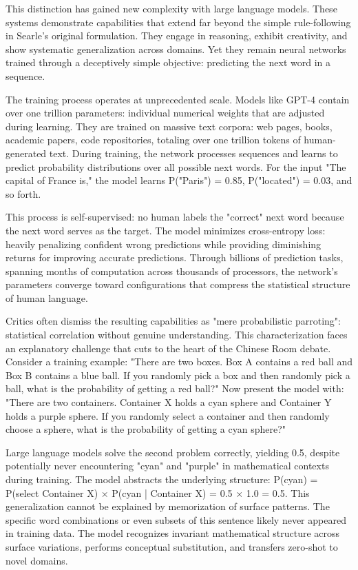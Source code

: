 This distinction has gained new complexity with large language models. These systems demonstrate capabilities that extend far beyond the simple rule-following in Searle's original formulation. They engage in reasoning, exhibit creativity, and show systematic generalization across domains. Yet they remain neural networks trained through a deceptively simple objective: predicting the next word in a sequence.

The training process operates at unprecedented scale. Models like GPT-4 contain over one trillion parameters: individual numerical weights that are adjusted during learning. They are trained on massive text corpora: web pages, books, academic papers, code repositories, totaling over one trillion tokens of human-generated text. During training, the network processes sequences and learns to predict probability distributions over all possible next words. For the input "The capital of France is," the model learns P("Paris") = 0.85, P("located") = 0.03, and so forth.

This process is self-supervised: no human labels the "correct" next word because the next word serves as the target. The model minimizes cross-entropy loss: heavily penalizing confident wrong predictions while providing diminishing returns for improving accurate predictions. Through billions of prediction tasks, spanning months of computation across thousands of processors, the network's parameters converge toward configurations that compress the statistical structure of human language.

Critics often dismiss the resulting capabilities as "mere probabilistic parroting": statistical correlation without genuine understanding. This characterization faces an explanatory challenge that cuts to the heart of the Chinese Room debate. Consider a training example: "There are two boxes. Box A contains a red ball and Box B contains a blue ball. If you randomly pick a box and then randomly pick a ball, what is the probability of getting a red ball?" Now present the model with: "There are two containers. Container X holds a cyan sphere and Container Y holds a purple sphere. If you randomly select a container and then randomly choose a sphere, what is the probability of getting a cyan sphere?"

Large language models solve the second problem correctly, yielding 0.5, despite potentially never encountering "cyan" and "purple" in mathematical contexts during training. The model abstracts the underlying structure: P(cyan) = P(select Container X) × P(cyan | Container X) = 0.5 × 1.0 = 0.5. This generalization cannot be explained by memorization of surface patterns. The specific word combinations or even subsets of this sentence likely never appeared in training data. The model recognizes invariant mathematical structure across surface variations, performs conceptual substitution, and transfers zero-shot to novel domains.

